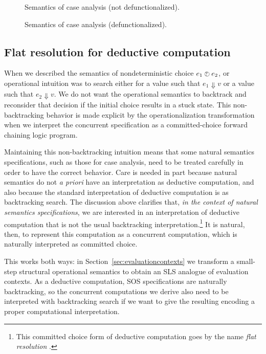 \begin{figure}
\caption{Semantics of case analysis (not defunctionalized).}
\label{fig:ssos-minml-case-good}
\bigskip
{}
\caption{Semantics of case analysis (defunctionalized).}
\label{fig:ssos-minml-case-good-defun}
\end{figure}


\subsection{Flat resolution for deductive computation}
\label{sec:flatresolution}

When we described the semantics of nondeterministic choice $e_1 \mathbin{\mbox{$\ocircle$\hspace{-7pt}{\footnotesize ?}\hspace{3pt}}}
e_2$, or operational intuition was to search either for a value such
that $e_1 \Downarrow v$ or a value such that $e_2 \Downarrow v$. We do
not want the operational semantics to backtrack and reconsider that
decision if the initial choice results in a stuck state. This
non-backtracking behavior is made explicit by the operationalization
transformation when we interpret the concurrent specification as a
committed-choice forward chaining logic program.

Maintaining this non-backtracking intuition means that some natural
semantics specifications, such as those for case analysis, need to be
treated carefully in order to have the correct behavior. Care is
needed in part because natural semantics do not {\it a priori} have an
interpretation as deductive computation, and also because the standard
interpretation of deductive computation is as backtracking search.
The discussion above clarifies that, {\it in the context of natural
  semantics specifications}, we are interested in an interpretation of
deductive computation that is not the usual backtracking
interpretation.\footnote{This committed choice form of deductive
  computation goes by the name {\it flat resolution}
  \cite{aitkaci99warrens}.} It is natural, then, to represent this
computation as a concurrent computation, which is naturally
interpreted as committed choice.

This works both ways: in Section~\ref{sec:evaluationcontexts}
we transform a small-step structural operational semantics to obtain
an SLS analogue of evaluation contexts. As a deductive computation,
SOS specifications are naturally backtracking, so the concurrent
computations we derive also need to be interpreted with backtracking
search if we want to give the resulting encoding a proper computational
interpretation.


